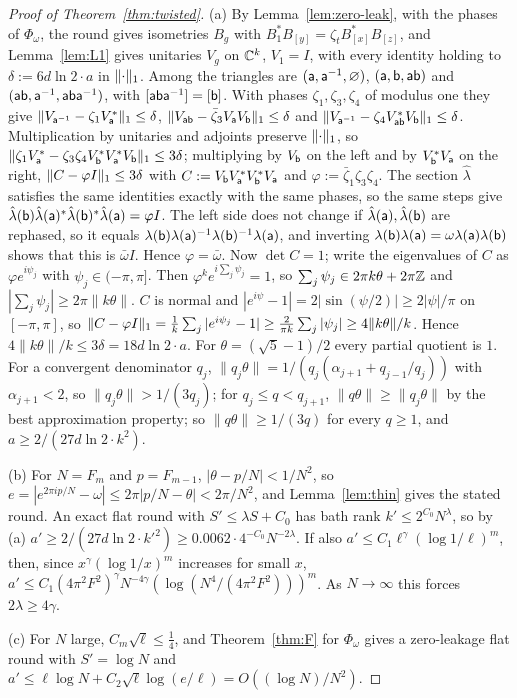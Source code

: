 \begin{proof}[Proof of Theorem~\ref{thm:twisted}]
(a) By Lemma~\ref{lem:zero-leak}, with the phases of $\Phi_\omega$, the round gives isometries $B_g$ with $B_1^*B_{[y]}=\zeta_tB_{[x]}^*B_{[z]}$, and Lemma~\ref{lem:L1} gives
unitaries $V_g$ on $\mathbb C^k$, $V_1=I$, with every identity holding to $\delta:=6d\ln2\cdot a$ in $\lVert \cdot\rVert_1$. Among the triangles are $(\mathsf a,\mathsf a^{-1},\varnothing)$,
$(\mathsf a,\mathsf b,\mathsf a\mathsf b)$ and $(\mathsf a\mathsf b,\mathsf a^{-1},\mathsf a\mathsf b\mathsf a^{-1})$, with $[\mathsf a\mathsf b\mathsf a^{-1}]=[\mathsf b]$. With phases $\zeta_1,\zeta_3,\zeta_4$ of modulus one they give
$\lVert V_{\mathsf a^{-1}}-\zeta_1V_\mathsf a^*\rVert_1\le\delta$, $\lVert V_{\mathsf a\mathsf b}-\bar\zeta_3V_\mathsf a V_\mathsf b\rVert_1\le\delta$ and $\lVert V_{\mathsf a^{-1}}-\zeta_4V_{\mathsf a\mathsf b}^*V_\mathsf b\rVert_1\le\delta$.
Multiplication by unitaries and adjoints preserve $\lVert \cdot\rVert_1$, so $\lVert \zeta_1V_\mathsf a^*-\zeta_3\zeta_4V_\mathsf b^*V_\mathsf a^*V_\mathsf b\rVert_1\le3\delta$; multiplying by $V_\mathsf b$ on the
left and by $V_\mathsf b^*V_\mathsf a$ on the right, $\lVert C-\varphi I\rVert_1\le3\delta$ with $C:=V_\mathsf b V_\mathsf a^*V_\mathsf b^*V_\mathsf a$ and $\varphi:=\bar\zeta_1\zeta_3\zeta_4$. The section $\hat\lambda$
satisfies the same identities exactly with the same phases, so the same steps give $\hat\lambda(\mathsf b)\hat\lambda(\mathsf a)^*\hat\lambda(\mathsf b)^*\hat\lambda(\mathsf a)=\varphi I$. The
left side does not change if $\hat\lambda(\mathsf a),\hat\lambda(\mathsf b)$ are rephased, so it equals $\lambda(\mathsf b)\lambda(\mathsf a)^{-1}\lambda(\mathsf b)^{-1}\lambda(\mathsf a)$, and inverting
$\lambda(\mathsf b)\lambda(\mathsf a)=\omega\lambda(\mathsf a)\lambda(\mathsf b)$ shows that this is $\bar\omega I$. Hence $\varphi=\bar\omega$. Now $\det C=1$; write the eigenvalues of $C$ as
$\varphi e^{i\psi_j}$ with $\psi_j\in(-\pi,\pi]$. Then $\varphi^ke^{i\sum_j\psi_j}=1$, so $\sum_j\psi_j\in2\pi k\theta+2\pi\mathbb Z$ and $|\sum_j\psi_j|\ge2\pi\|k\theta\|$. $C$ is normal
and $|e^{i\psi}-1|=2|\sin(\psi/2)|\ge2|\psi|/\pi$ on $[-\pi,\pi]$, so $\lVert C-\varphi I\rVert_1=\frac1k\sum_j|e^{i\psi_j}-1|\ge\frac2{\pi k}\sum_j|\psi_j|\ge4\|k\theta\|/k$. Hence
$4\|k\theta\|/k\le3\delta=18d\ln2\cdot a$. For $\theta=(\sqrt5-1)/2$ every partial quotient is $1$. For a convergent denominator $q_j$,
$\|q_j\theta\|=1/(q_j(\alpha_{j+1}+q_{j-1}/q_j))$ with $\alpha_{j+1}<2$, so $\|q_j\theta\|>1/(3q_j)$; for $q_j\le q<q_{j+1}$, $\|q\theta\|\ge\|q_j\theta\|$ by the best
approximation property; so $\|q\theta\|\ge1/(3q)$ for every $q\ge1$, and $a\ge2/(27d\ln2\cdot k^2)$.

(b) For $N=F_m$ and $p=F_{m-1}$, $|\theta-p/N|<1/N^2$, so $e=|e^{2\pi ip/N}-\omega|\le2\pi|p/N-\theta|<2\pi/N^2$, and Lemma~\ref{lem:thin} gives the stated round. An exact
flat round with $S'\le\lambda S+C_0$ has bath rank $k'\le2^{C_0}N^\lambda$, so by (a) $a'\ge2/(27d\ln2\cdot k'^2)\ge0.0062\cdot4^{-C_0}N^{-2\lambda}$. If also
$a'\le C_1\ell^\gamma(\log1/\ell)^m$, then, since $x^\gamma(\log1/x)^m$ increases for small $x$, $a'\le C_1(4\pi^2F^2)^\gamma N^{-4\gamma}(\log(N^4/(4\pi^2F^2)))^m$. As
$N\to\infty$ this forces $2\lambda\ge4\gamma$.

(c) For $N$ large, $C_m\sqrt\ell\le\frac14$, and Theorem~\ref{thm:F} for $\Phi_\omega$ gives a zero-leakage flat round with $S'=\log N$ and
$a'\le\ell\log N+C_2\sqrt\ell\log(e/\ell)=O((\log N)/N^2)$.
\end{proof}
